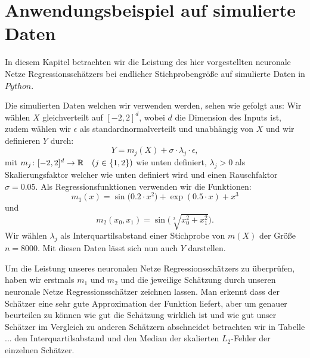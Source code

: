 \chapter{Anwendungsbeispiel auf simulierte Daten}
\label{chap:4}

In diesem Kapitel betrachten wir die Leistung des hier vorgestellten neuronale Netze Regressionsschätzers bei endlicher Stichprobengröße auf simulierte Daten in $Python$.

Die simulierten Daten welchen wir verwenden werden, sehen wie gefolgt aus:
Wir wählen $X$ gleichverteilt auf $[-2, 2]^d$, wobei $d$ die Dimension des Inputs ist, zudem wählen wir $\epsilon$ als standardnormalverteilt und unabhängig von $X$ und wir definieren $Y$ durch:
$$Y = m_j(X) + \sigma \cdot \lambda_j \cdot \epsilon,$$ 
mit $m_j \colon [-2, 2]^d \to \mathbb{R} \quad (j \in \{1, 2\})$ wie unten definiert, $\lambda_j > 0$ als Skalierungsfaktor welcher wie unten definiert wird und einen Rauschfaktor $\sigma = 0.05.$ Als Regressionsfunktionen verwenden wir die Funktionen:
$$ m_1(x) =  \sin\big(0.2 \cdot x^2\big) + \exp(0.5 \cdot x) + x^3$$
und
$$ m_2(x_0, x_1) = \sin\big(\sqrt[2]{x_0^2 + x_1^2}\big).$$
Wir wählen $\lambda_j$ als Interquartilsabstand einer Stichprobe von $m(X)$ der Größe $n = 8000$. Mit diesen Daten lässt sich nun auch $Y$ darstellen.

Um die Leistung unseres neuronalen Netze Regressionsschätzers zu überprüfen, haben wir erstmals $m_1$ und $m_2$ und die jeweilige Schätzung durch unseren neuronale Netze Regressionsschätzer zeichnen lassen. 
Man erkennt dass der Schätzer eine sehr gute Approximation der Funktion liefert, aber um genauer beurteilen zu können wie gut die Schätzung wirklich ist und wie gut unser Schätzer im Vergleich zu anderen Schätzern abschneidet betrachten wir in Tabelle ... den Interquartilsabstand und den Median der skalierten $L_2$-Fehler der einzelnen Schätzer. 

